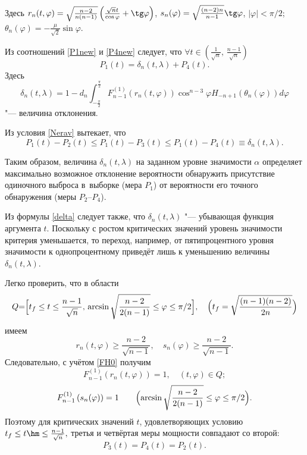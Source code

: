 Здесь
$r_n(t,\varphi)=\sqrt{\frac{n-2}{n(n-1)}}\left(\frac{\sqrt{n}t}{\cos\varphi}+ \tg \varphi\right)$, 
$s_n(\varphi)=\sqrt{\frac{(n-2)n}{n-1}}\tg\varphi$, $|\varphi|<\pi/2$;
$\theta_n(\varphi)=-\frac{\mu}{\sqrt{2}}\sin\varphi$.

Из соотношений \eqref{P1new} и \eqref{P4new}  следует, что $\forall t \in \left(\frac{1}{\sqrt{n}},\,\frac{n-1}{\sqrt{n}}\right)$
$$P_1(t)=\delta_n(t,\lambda)+P_4(t).$$
Здесь 
\begin{equation}\label{delta}
\delta_n(t,\lambda)=1-d_n\int_{-\frac{\pi}{2}}^{\frac{\pi}{2}}F_{n-1}^{(1)}\left(r_n(t,\varphi)\right)\cos^{n-3}\varphi H_{-n+1}(\theta_n(\varphi))d\varphi
\end{equation}
"--- величина отклонения.

Из условия \eqref{Nerav} вытекает, что
$$
P_1(t)-P_2(t)\le P_1(t)-P_3(t)\le P_1(t)-P_4(t)\equiv \delta_n(t,\lambda).
$$

Таким образом, величина $\delta_n(t,\lambda)$ на заданном уровне значимости $\alpha$ определяет  максимально возможное отклонение вероятности обнаружить присутствие одиночного выброса  в~выборке (мера $P_1$) от вероятности его точного обнаружения (меры $P_2$--$P_4$). 

Из  формулы \eqref{delta} следует также, что  $\delta_n(t,\lambda)$ "--- убывающая функция аргумента $t$.
Поскольку с ростом критических значений уровень значимости критерия уменьшается, то переход, например, от пятипроцентного уровня значимости к однопроцентному приведёт лишь к уменьшению величины  $\delta_n(t,\lambda)$.


Легко проверить, что в области
$$
Q{=}\Bigl[ t_f\le t\le \frac{n-1}{\sqrt{n}},\,\arcsin\sqrt{\frac{{n-2}}{2(n-1)}}\le\varphi\le\pi/2 \Bigr],\quad  
\Bigl(t_f=\sqrt{\frac{(n-1)(n-2)}{2n}}\Bigr)
$$
имеем
$$r_n(t,\varphi)\ge\frac{n-2}{\sqrt{n-1}},\quad s_n(\varphi)\ge\frac{n-2}{\sqrt{n-1}}.$$
Следовательно, с учётом \eqref{FH0} получим
\[F_{n-1}^{(1)}\left(r_n(t,\varphi)\right)=1, \quad (t,\varphi)\in Q;\]
\[F_{n-1}^{(1)}\left(s_n(\varphi)\right)=1 \qquad \Bigl(\arcsin\sqrt{\frac{n-2}{2(n-1)}}\le\varphi\le\pi/2\Bigr).
\]
Поэтому для критических значений  $t$,  удовлетворяющих условию
$t_f\le t \hm\le \frac{n-1}{\sqrt{n}},$
третья и четвёртая меры мощности совпадают со второй:
$$P_3(t)=P_4(t)=P_2(t).$$

